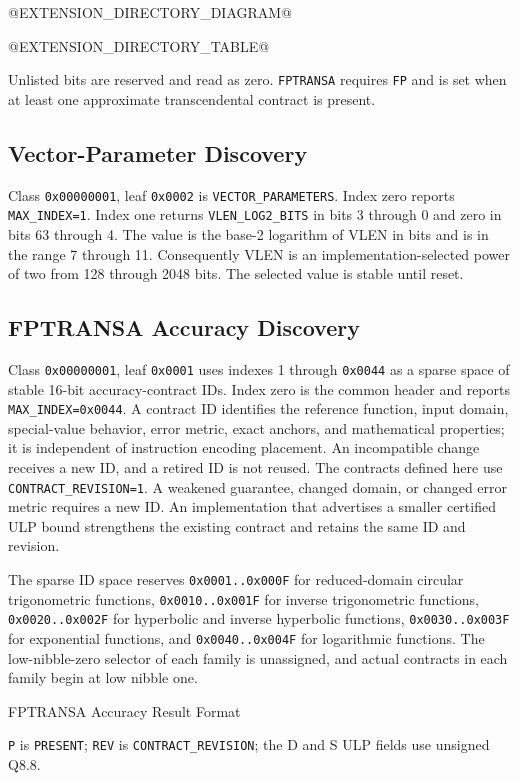 @EXTENSION_DIRECTORY_DIAGRAM@

@EXTENSION_DIRECTORY_TABLE@

Unlisted bits are reserved and read as zero. \texttt{FPTRANSA} requires \texttt{FP} and is set when at least one approximate
transcendental contract is present.

\subsection{Vector-Parameter Discovery}
Class \texttt{0x00000001}, leaf \texttt{0x0002} is \texttt{VECTOR\_PARAMETERS}. Index zero reports
\texttt{MAX\_INDEX=1}. Index one returns \texttt{VLEN\_LOG2\_BITS} in bits 3 through 0 and zero in bits 63 through
4. The value is the base-2 logarithm of VLEN in bits and is in the range 7 through 11. Consequently VLEN is an
implementation-selected power of two from 128 through 2048 bits. The selected value is stable until reset.

\subsection{FPTRANSA Accuracy Discovery}
Class \texttt{0x00000001}, leaf \texttt{0x0001} uses indexes 1 through \texttt{0x0044} as a sparse space of stable
16-bit accuracy-contract IDs. Index zero is the common header and reports \texttt{MAX\_INDEX=0x0044}.
A contract ID identifies the reference function, input domain, special-value behavior, error metric, exact anchors,
and mathematical properties; it is independent of instruction encoding placement. An incompatible change receives a
new ID, and a retired ID is not reused. The contracts defined here use \texttt{CONTRACT\_REVISION=1}. A weakened
guarantee, changed domain, or changed error metric requires a new ID.
An implementation that advertises a smaller certified ULP bound strengthens the existing contract and retains the
same ID and revision.

The sparse ID space reserves \texttt{0x0001..0x000F} for reduced-domain circular trigonometric functions,
\texttt{0x0010..0x001F} for inverse trigonometric functions, \texttt{0x0020..0x002F} for hyperbolic and inverse
hyperbolic functions, \texttt{0x0030..0x003F} for exponential functions, and
\texttt{0x0040..0x004F} for logarithmic functions. The low-nibble-zero selector of each family is unassigned, and
actual contracts in each family begin at low nibble one.

\begin{manuallistedformatdiagram}{FPTRANSA Accuracy Result Format}
\end{manuallistedformatdiagram}
{\small
\texttt{P} is \texttt{PRESENT}; \texttt{REV} is \texttt{CONTRACT\_REVISION}; the D and S ULP
fields use unsigned Q8.8.
\par}

